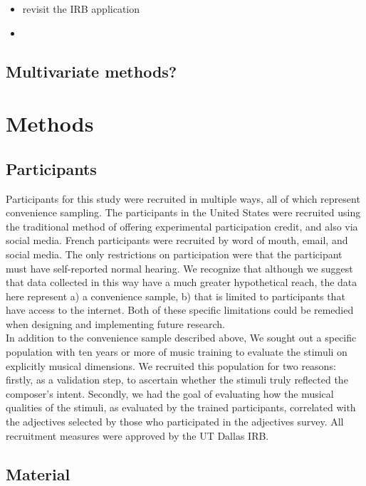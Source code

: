 \documentclass[
  english,
  man]{apa6}
\begin{document}
\begin{itemize}
\item
  revisit the IRB application
\item
\end{itemize}

\hypertarget{multivariate-methods}{%
\subsection{Multivariate methods?}\label{multivariate-methods}}

\hypertarget{methods}{%
\section{Methods}\label{methods}}

\hypertarget{participants}{%
\subsection{Participants}\label{participants}}

Participants for this study were recruited in multiple ways, all of which represent convenience sampling. The participants in the United States were recruited using the traditional method of offering experimental participation credit, and also via social media. French participants were recruited by word of mouth, email, and social media. The only restrictions on participation were that the participant must have self-reported normal hearing. We recognize that although we suggest that data collected in this way have a much greater hypothetical reach, the data here represent a) a convenience sample, b) that is limited to participants that have access to the internet. Both of these specific limitations could be remedied when designing and implementing future research.\\
In addition to the convenience sample described above, We sought out a specific population with ten years or more of music training to evaluate the stimuli on explicitly musical dimensions. We recruited this population for two reasons: firstly, as a validation step, to ascertain whether the stimuli truly reflected the composer's intent. Secondly, we had the goal of evaluating how the musical qualities of the stimuli, as evaluated by the trained participants, correlated with the adjectives selected by those who participated in the adjectives survey.
All recruitment measures were approved by the UT Dallas IRB.

\hypertarget{material}{%
\subsection{Material}\label{material}}
\end{document}
